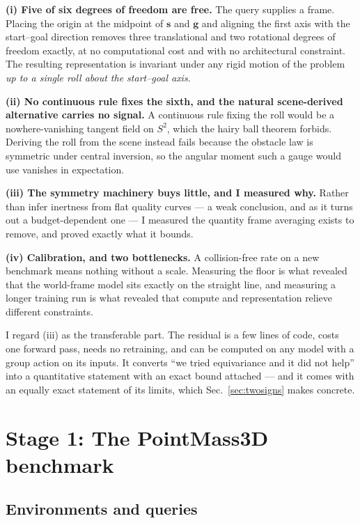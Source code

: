 \documentclass[11pt,a4paper]{article}
\newcommand{\svec}{\mathbf{s}}
\newcommand{\gvec}{\mathbf{g}}
\begin{document}
\textbf{(i) Five of six degrees of freedom are free.} The query supplies a
frame. Placing the origin at the midpoint of $\svec$ and $\gvec$ and aligning the
first axis with the start--goal direction removes three translational and two
rotational degrees of freedom exactly, at no computational cost and with no
architectural constraint. The resulting representation is invariant under any
rigid motion of the problem \emph{up to a single roll about the start--goal
axis}.

\textbf{(ii) No continuous rule fixes the sixth, and the natural scene-derived
alternative carries no signal.}
A continuous rule fixing the roll would be a nowhere-vanishing tangent field on
$S^2$, which the hairy ball theorem forbids. Deriving the roll from the scene
instead fails because the obstacle law is symmetric under central inversion, so
the angular moment such a gauge would use vanishes in expectation.

\textbf{(iii) The symmetry machinery buys little, and I measured why.} Rather
than infer inertness from flat quality curves --- a weak conclusion, and as it
turns out a budget-dependent one --- I measured the quantity frame averaging
exists to remove, and proved exactly what it bounds.

\textbf{(iv) Calibration, and two bottlenecks.} A collision-free rate on a new
benchmark means nothing without a scale. Measuring the floor is what revealed
that the world-frame model sits exactly on the straight line, and measuring a
longer training run is what revealed that compute and representation relieve
different constraints.

I regard (iii) as the transferable part. The residual is a few lines of code,
costs one forward pass, needs no retraining, and can be computed on any model
with a group action on its inputs. It converts ``we tried equivariance and it did
not help'' into a quantitative statement with an exact bound attached --- and it
comes with an equally exact statement of its limits, which
Sec.~\ref{sec:twosigns} makes concrete.

\section{Stage 1: The PointMass3D benchmark}
\label{sec:benchmark}

\subsection{Environments and queries}
\end{document}
